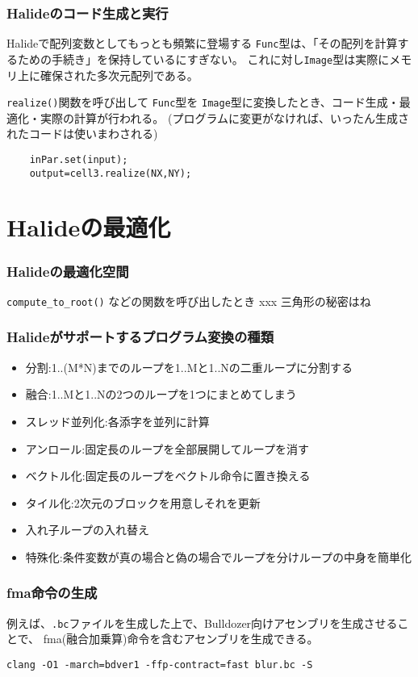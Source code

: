 \documentclass[dvipdfmx,cjk]{beamer}
\begin{document}
\begin{frame}[fragile]\frametitle{Halideのコード生成と実行}

Halideで配列変数としてもっとも頻繁に登場する
{\tt Func}型は、「その配列を計算するための手続き」を保持しているにすぎない。
これに対し{\tt Image}型は実際にメモリ上に確保された多次元配列である。

{\tt realize()}関数を呼び出して
{\tt Func}型を
{\tt Image}型に変換したとき、コード生成・最適化・実際の計算が行われる。
(プログラムに変更がなければ、いったん生成されたコードは使いまわされる)

\begingroup
    \fontsize{9pt}{10pt}\selectfont
\begin{verbatim}
    inPar.set(input);
    output=cell3.realize(NX,NY);
\end{verbatim}
\endgroup

\end{frame}


\section{Halideの最適化} 
\begin{frame}\frametitle{Halideの最適化空間}
{\tt compute\_to\_root()} などの関数を呼び出したとき
xxx 三角形の秘密はね
\end{frame}


\begin{frame}\frametitle{Halideがサポートするプログラム変換の種類}
\begin{itemize}
  \item 分割:1..(M*N)までのループを1..Mと1..Nの二重ループに分割する
  \item 融合:1..Mと1..Nの2つのループを1つにまとめてしまう
  \item スレッド並列化:各添字を並列に計算
  \item アンロール:固定長のループを全部展開してループを消す
  \item ベクトル化:固定長のループをベクトル命令に置き換える
  \item タイル化:2次元のブロックを用意しそれを更新
  \item 入れ子ループの入れ替え
  \item 特殊化:条件変数が真の場合と偽の場合でループを分けループの中身を簡単化
\end{itemize}
\end{frame}

\begin{frame}[fragile]\frametitle{fma命令の生成}

例えば、{\tt .bc}ファイルを生成した上で、Bulldozer向けアセンブリを生成させることで、
fma(融合加乗算)命令を含むアセンブリを生成できる。
\begingroup
    \fontsize{8pt}{9pt}\selectfont
\begin{verbatim}
clang -O1 -march=bdver1 -ffp-contract=fast blur.bc -S
\end{verbatim}
\endgroup
\vspace{-1cm}


\end{frame}
\end{document}
